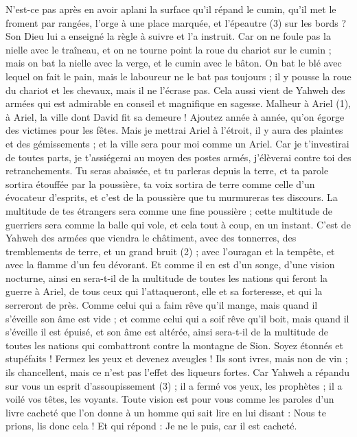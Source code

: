 \begin{multicols}{2}
N’est-ce pas après en avoir aplani la surface qu’il répand le cumin, qu’il met le froment par rangées, l’orge à une place marquée, et l’épeautre (3) sur les bords ?
Son Dieu lui a enseigné la règle à suivre et l’a instruit.
Car on ne foule pas la nielle avec le traîneau, et on ne tourne point la roue du chariot sur le cumin ; mais on bat la nielle avec la verge, et le cumin avec le bâton.
On bat le blé avec lequel on fait le pain, mais le laboureur ne le bat pas toujours ; il y pousse la roue du chariot et les chevaux, mais il ne l’écrase pas.
Cela aussi vient de Yahweh des armées qui est admirable en conseil et magnifique en sagesse.
\VerseOne{}Malheur à Ariel (1), à Ariel, la ville dont David fit sa demeure ! Ajoutez année à année, qu'on égorge des victimes pour les fêtes.
Mais je mettrai Ariel à l'étroit, il y aura des plaintes et des gémissements ; et la ville sera pour moi comme un Ariel.
Car je t’investirai de toutes parts, je t'assiégerai au moyen des postes armés, j’élèverai contre toi des retranchements.
Tu seras abaissée, et tu parleras depuis la terre, et ta parole sortira étouffée par la poussière, ta voix sortira de terre comme celle d’un évocateur d’esprits, et c’est de la poussière que tu murmureras tes discours.
La multitude de tes étrangers sera comme une fine poussière ; cette multitude de guerriers sera comme la balle qui vole, et cela tout à coup, en un instant.
C’est de Yahweh des armées que viendra le châtiment, avec des tonnerres, des tremblements de terre, et un grand bruit (2) ; avec l’ouragan et la tempête, et avec la flamme d’un feu dévorant.
Et comme il en est d’un songe, d’une vision nocturne, ainsi en sera-t-il de la multitude de toutes les nations qui feront la guerre à Ariel, de tous ceux qui l’attaqueront, elle et sa forteresse, et qui la serreront de près.
Comme celui qui a faim rêve qu'il mange, mais quand il s’éveille son âme est vide ; et comme celui qui a soif rêve qu'il boit, mais quand il s’éveille il est épuisé, et son âme est altérée, ainsi sera-t-il de la multitude de toutes les nations qui combattront contre la montagne de Sion.
Soyez étonnés et stupéfaits ! Fermez les yeux et devenez aveugles ! Ils sont ivres, mais non de vin ; ils chancellent, mais ce n’est pas l’effet des liqueurs fortes.
Car Yahweh a répandu sur vous un esprit d’assoupissement (3) ; il a fermé vos yeux, les prophètes ; il a voilé vos têtes, les voyants.
Toute vision est pour vous comme les paroles d'un livre cacheté que l’on donne à un homme qui sait lire en lui disant : Nous te prions, lis donc cela ! Et qui répond : Je ne le puis, car il est cacheté.

\end{multicols}
